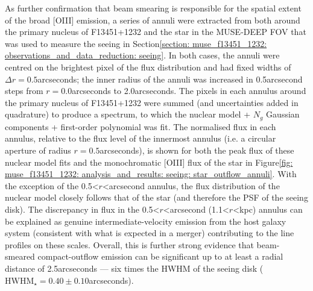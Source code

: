 As further confirmation that beam smearing is responsible for the spatial extent of the broad [OIII] emission, a series of annuli were extracted from both around the primary nucleus of F13451+1232 and the star in the MUSE-DEEP FOV that was used to measure the seeing in Section\;\ref{section: muse_f13451_1232: observations_and_data_reduction: seeing}. In both cases, the annuli were centred on the brightest pixel of the flux distribution and had fixed widths of ${\Delta}r=0.5$\;arcseconds; the inner radius of the annuli was increased in 0.5\;arcsecond steps from $r=0.0$\;arcseconds to 2.0\;arcseconds. The pixels in each annulus around the primary nucleus of F13451+1232 were summed (and uncertainties added in quadrature) to produce a spectrum, to which the nuclear model + $N_g$ Gaussian components + first-order polynomial was fit. The normalised flux in each annulus, relative to the flux level of the innermost annulus (i.e. a circular aperture of radius $r=0.5$\;arcseconds), is shown for both the peak flux of these nuclear model fits and the monochromatic [OIII] flux of the star in Figure\;\ref{fig: muse_f13451_1232: analysis_and_results: seeing: star_outflow_annuli}. With the exception of the 0.5\;\textless\;$r$\;\textless{}\;arcsecond annulus, the flux distribution of the nuclear model closely follows that of the star (and therefore the PSF of the seeing disk). The discrepancy in flux in the 0.5\;\textless\;$r$\;\textless{}\;arcsecond (1.1\;\textless\;$r$\;\textless{}\;kpc) annulus can be explained as genuine intermediate-velocity emission from the host galaxy system (consistent with what is expected in a merger) contributing to the line profiles on these scales. Overall, this is further strong evidence that beam-smeared compact-outflow emission can be significant up to at least a radial distance of 2.5\;arcseconds --- six times the HWHM of the seeing disk ($\mathrm{HWHM}_\star=0.40\pm0.10$\;arcseconds).

